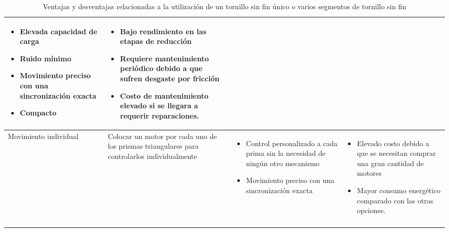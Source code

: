 \begin{center}
\begin{longtable}[!htb]{| m{5em} | m{12em} | m{12em}| m{12em}|}
    \begin{itemize}
        \item Elevada capacidad de carga
        \item Ruido mínimo
        \item Movimiento preciso con una sincronización exacta
        \item Compacto
    \end{itemize}
    & 
    \begin{itemize}
        \item Bajo rendimiento en las etapas de reducción
        \item Requiere mantenimiento periódico debido a que sufren desgaste por fricción
        \item Costo de mantenimiento elevado si se llegara a requerir reparaciones.
    \end{itemize}\\
    \hline
    Movimiento individual& Colocar un motor por cada uno de los prismas triangulares para controlarlos individualmente& 
    \begin{itemize}
        \item Control personalizado a cada prima sin la necesidad de ningún otro mecanismo 
        \item Movimiento preciso con una sincronización exacta
    \end{itemize}
    & 
    \begin{itemize}
        \item Elevado costo debido a que se necesitan comprar una gran cantidad de motores
        \item Mayor consumo energético comparado con las otras opciones.
    \end{itemize}\\
    \hline
    \caption{Ventajas y desventajas relacionadas a la utilización de un tornillo sin fin único o varios segmentos de tornillo sin fin}
    \label{tab:ComTornilloSF}
    \end{longtable}
\end{center}